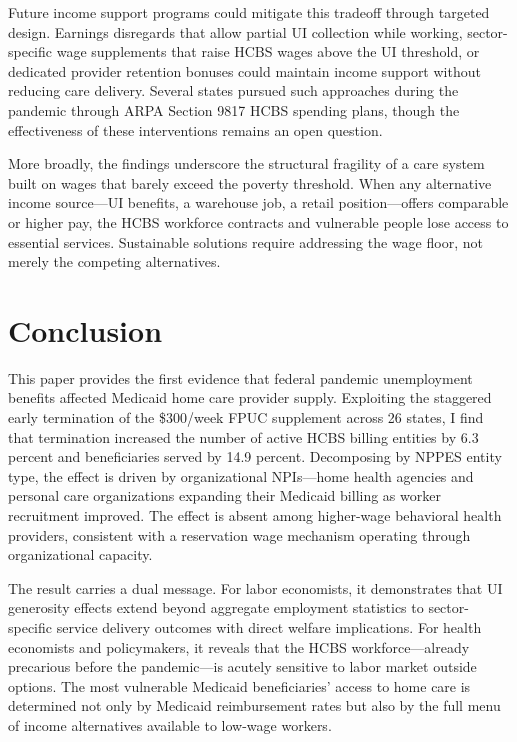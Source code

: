 \documentclass[12pt]{article}
\begin{document}
Future income support programs could mitigate this tradeoff through targeted design. Earnings disregards that allow partial UI collection while working, sector-specific wage supplements that raise HCBS wages above the UI threshold, or dedicated provider retention bonuses could maintain income support without reducing care delivery. Several states pursued such approaches during the pandemic through ARPA Section 9817 HCBS spending plans, though the effectiveness of these interventions remains an open question.

More broadly, the findings underscore the structural fragility of a care system built on wages that barely exceed the poverty threshold. When any alternative income source---UI benefits, a warehouse job, a retail position---offers comparable or higher pay, the HCBS workforce contracts and vulnerable people lose access to essential services. Sustainable solutions require addressing the wage floor, not merely the competing alternatives.


\section{Conclusion}

This paper provides the first evidence that federal pandemic unemployment benefits affected Medicaid home care provider supply. Exploiting the staggered early termination of the \$300/week FPUC supplement across 26 states, I find that termination increased the number of active HCBS billing entities by 6.3 percent and beneficiaries served by 14.9 percent. Decomposing by NPPES entity type, the effect is driven by organizational NPIs---home health agencies and personal care organizations expanding their Medicaid billing as worker recruitment improved. The effect is absent among higher-wage behavioral health providers, consistent with a reservation wage mechanism operating through organizational capacity.

The result carries a dual message. For labor economists, it demonstrates that UI generosity effects extend beyond aggregate employment statistics to sector-specific service delivery outcomes with direct welfare implications. For health economists and policymakers, it reveals that the HCBS workforce---already precarious before the pandemic---is acutely sensitive to labor market outside options. The most vulnerable Medicaid beneficiaries' access to home care is determined not only by Medicaid reimbursement rates but also by the full menu of income alternatives available to low-wage workers.
\end{document}
